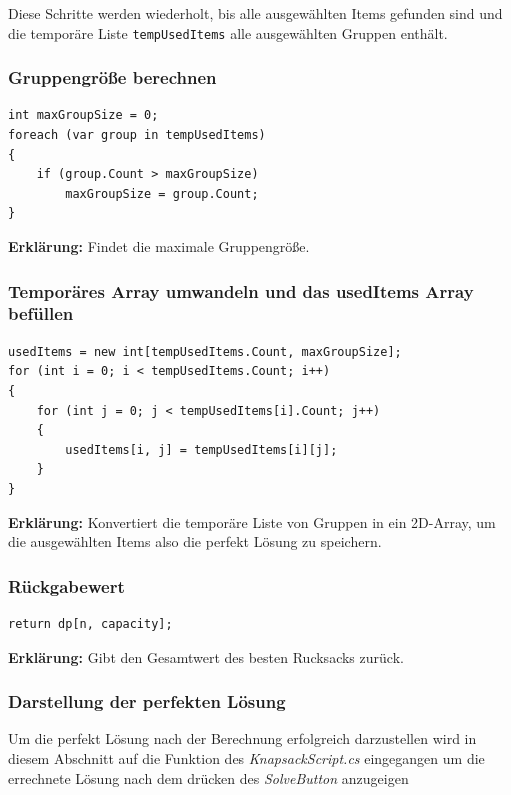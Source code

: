 Diese Schritte werden wiederholt, bis alle ausgewählten Items gefunden sind und die temporäre Liste \texttt{tempUsedItems} alle ausgewählten Gruppen enthält.\\

\subsubsection{Gruppengröße berechnen}
\begin{lstlisting}[style=csharp, caption={}, label=code:maxgroup]
int maxGroupSize = 0;
foreach (var group in tempUsedItems)
{
    if (group.Count > maxGroupSize)
        maxGroupSize = group.Count;
}
\end{lstlisting}
\textbf{Erklärung:} Findet die maximale Gruppengröße.\\

\subsubsection{Temporäres Array umwandeln und das usedItems Array befüllen}
\begin{lstlisting}[style=csharp, caption={}, label=code:convert]
usedItems = new int[tempUsedItems.Count, maxGroupSize];
for (int i = 0; i < tempUsedItems.Count; i++)
{
    for (int j = 0; j < tempUsedItems[i].Count; j++)
    {
        usedItems[i, j] = tempUsedItems[i][j];
    }
}
\end{lstlisting}
\textbf{Erklärung:} Konvertiert die temporäre Liste von Gruppen in ein 2D-Array, um die ausgewählten Items also die perfekt Lösung zu speichern.\\

\subsubsection{Rückgabewert}
\begin{lstlisting}[style=csharp, caption={}, label=code:return]
return dp[n, capacity];
\end{lstlisting}
\textbf{Erklärung:} Gibt den Gesamtwert des besten Rucksacks zurück.\\

\subsubsection{Darstellung der perfekten Lösung}
Um die perfekt Lösung nach der Berechnung erfolgreich darzustellen wird in diesem Abschnitt auf die  Funktion des
\textit{KnapsackScript.cs} eingegangen um die errechnete Lösung nach dem drücken des \textit{SolveButton} anzugeigen

